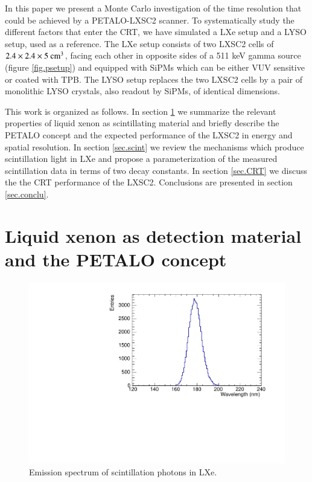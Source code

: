\documentclass[review]{elsarticle}
\begin{document}
In this paper we present a Monte Carlo investigation of the time resolution
that could be achieved by a PETALO-LXSC2 scanner. To systematically study the different factors that enter the CRT, we have simulated a LXe setup and a LYSO setup, used as a reference. The LXe setup consists of two LXSC2 cells of 
$2.4 \times 2.4 \times 5 {\rm ~cm^3}$, facing each other in opposite sides of a 511 keV gamma source 
(figure \ref{fig.psetup}) and equipped with SiPMs which can be either VUV sensitive or coated with  TPB. The  LYSO setup replaces the two LXSC2 cells by a pair of  monolithic LYSO crystals, also readout by SiPMs, of identical dimensions.

This work is organized as follows. In section \ref{sec.LXe} we summarize the relevant properties of liquid xenon as scintillating material and briefly describe the PETALO concept and the expected performance of the LXSC2 in energy and spatial resolution. In section \ref{sec.scint} we review the mechanisms which produce scintillation light in LXe and propose a parameterization of the measured scintillation data in terms of two decay constants. In section \ref{sec.CRT} we discuss the the CRT performance of the LXSC2. Conclusions are presented in section \ref{sec.conclu}. 

\section{Liquid xenon as detection material and the PETALO concept}
\label{sec.LXe}

\begin{figure}[!bhtp]
	\centering
	\includegraphics[scale=0.5]{../img/ScintillationSpectrumLXe.pdf}
	\caption{\label{fig.spectrumLXe} Emission spectrum of scintillation photons in LXe.}
\end{figure}
\end{document}
